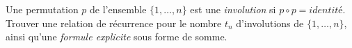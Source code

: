 Une permutation $p$ de l'ensemble $\{1, \ldots, n\}$ est une \emph{involution} si $p \circ p = \textit{identité}$. Trouver une relation de récurrence pour le nombre $t_n$ d'involutions de $\{1, \ldots, n\}$, ainsi qu'une \emph{formule explicite} sous forme de somme.
